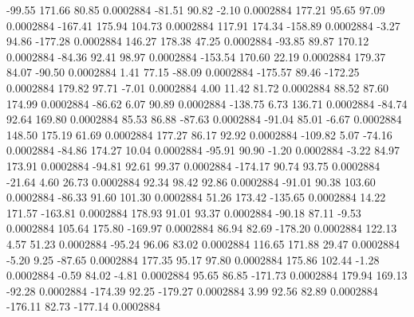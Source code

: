       -99.55      171.66       80.85     0.0002884
      -81.51       90.82       -2.10     0.0002884
      177.21       95.65       97.09     0.0002884
     -167.41      175.94      104.73     0.0002884
      117.91      174.34     -158.89     0.0002884
       -3.27       94.86     -177.28     0.0002884
      146.27      178.38       47.25     0.0002884
      -93.85       89.87      170.12     0.0002884
      -84.36       92.41       98.97     0.0002884
     -153.54      170.60       22.19     0.0002884
      179.37       84.07      -90.50     0.0002884
        1.41       77.15      -88.09     0.0002884
     -175.57       89.46     -172.25     0.0002884
      179.82       97.71       -7.01     0.0002884
        4.00       11.42       81.72     0.0002884
       88.52       87.60      174.99     0.0002884
      -86.62        6.07       90.89     0.0002884
     -138.75        6.73      136.71     0.0002884
      -84.74       92.64      169.80     0.0002884
       85.53       86.88      -87.63     0.0002884
      -91.04       85.01       -6.67     0.0002884
      148.50      175.19       61.69     0.0002884
      177.27       86.17       92.92     0.0002884
     -109.82        5.07      -74.16     0.0002884
      -84.86      174.27       10.04     0.0002884
      -95.91       90.90       -1.20     0.0002884
       -3.22       84.97      173.91     0.0002884
      -94.81       92.61       99.37     0.0002884
     -174.17       90.74       93.75     0.0002884
      -21.64        4.60       26.73     0.0002884
       92.34       98.42       92.86     0.0002884
      -91.01       90.38      103.60     0.0002884
      -86.33       91.60      101.30     0.0002884
       51.26      173.42     -135.65     0.0002884
       14.22      171.57     -163.81     0.0002884
      178.93       91.01       93.37     0.0002884
      -90.18       87.11       -9.53     0.0002884
      105.64      175.80     -169.97     0.0002884
       86.94       82.69     -178.20     0.0002884
      122.13        4.57       51.23     0.0002884
      -95.24       96.06       83.02     0.0002884
      116.65      171.88       29.47     0.0002884
       -5.20        9.25      -87.65     0.0002884
      177.35       95.17       97.80     0.0002884
      175.86      102.44       -1.28     0.0002884
       -0.59       84.02       -4.81     0.0002884
       95.65       86.85     -171.73     0.0002884
      179.94      169.13      -92.28     0.0002884
     -174.39       92.25     -179.27     0.0002884
        3.99       92.56       82.89     0.0002884
     -176.11       82.73     -177.14     0.0002884
